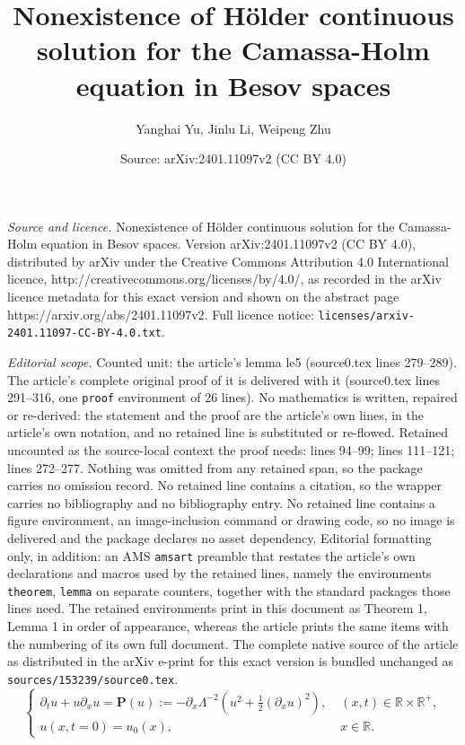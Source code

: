 \documentclass[10pt,a4paper]{amsart}
\title{Nonexistence of H\"{o}lder continuous solution for the Camassa-Holm equation in Besov spaces}
\author{Yanghai Yu, Jinlu Li, Weipeng Zhu}
\date{Source: arXiv:2401.11097v2 (CC BY 4.0)}
\newcommand{\R}{\mathbb{R}}
\newcommand{\fr}{\frac}
\newcommand{\pa}{\partial}
\begin{document}
\maketitle

\noindent\emph{Source and licence.} Nonexistence of H\"{o}lder continuous solution for the Camassa-Holm equation in Besov spaces. Version arXiv:2401.11097v2 (CC BY 4.0), distributed by arXiv under the Creative Commons Attribution 4.0 International licence, http://creativecommons.org/licenses/by/4.0/, as recorded in the arXiv licence metadata for this exact version and shown on the abstract page https://arxiv.org/abs/2401.11097v2. Full licence notice: \texttt{licenses/arxiv-2401.11097-CC-BY-4.0.txt}.\par\smallskip

\noindent\textit{Editorial scope.} Counted unit: the article's lemma le5 (source0.tex lines 279--289). The article's complete original proof of it is delivered with it (source0.tex lines 291--316, one \texttt{proof} environment of 26 lines). No mathematics is written, repaired or re-derived: the statement and the proof are the article's own lines, in the article's own notation, and no retained line is substituted or re-flowed.  Retained uncounted as the source-local context the proof needs: lines 94--99; lines 111--121; lines 272--277.  Nothing was omitted from any retained span, so the package carries no omission record.  No retained line contains a citation, so the wrapper carries no bibliography and no bibliography entry.  No retained line contains a figure environment, an image-inclusion command or drawing code, so no image is delivered and the package declares no asset dependency.  Editorial formatting only, in addition: an AMS \texttt{amsart} preamble that restates the article's own declarations and macros used by the retained lines, namely the environments \texttt{theorem}, \texttt{lemma} on separate counters, together with the standard packages those lines need.  The retained environments print in this document as Theorem 1, Lemma 1 in order of appearance, whereas the article prints the same items with the numbering of its own full document.  The complete native source of the article as distributed in the arXiv e-print for this exact version is bundled unchanged as \texttt{sources/153239/source0.tex}.
\begin{equation}\label{CH}
\begin{cases}
\partial_tu+u\pa_xu=\mathbf{P}(u):=-\pa_x\Lambda^{-2}\left(u^2+\fr12(\pa_xu)^2\right), \; &(x,t)\in \R\times\R^+,\\
u(x,t=0)=u_0(x),\; &x\in \R.
\end{cases}
\end{equation}
\end{document}
